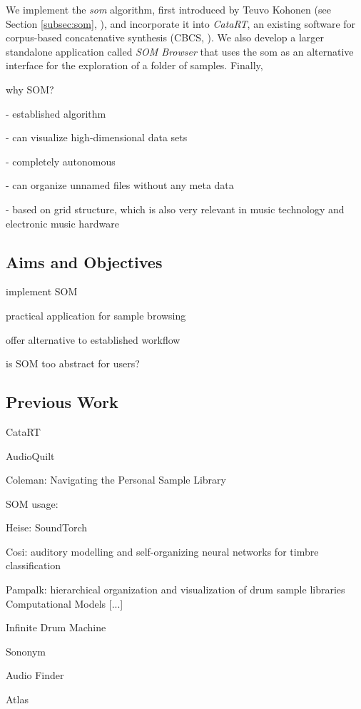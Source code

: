 \smallskip

We implement the \textit{\gls{som}} algorithm, first
introduced by Teuvo Kohonen (see Section \ref{subsec:som}, \citet{kohonen1990}),
and incorporate it into \textit{CataRT}, an existing software for corpus-based
concatenative synthesis (CBCS, \citet{schwarz2006}). We also develop a larger
standalone application called \textit{SOM Browser} that uses the \gls{som} as an
alternative interface for the exploration of a folder of samples. Finally,


\bigskip



why SOM?

- established algorithm

- can visualize high-dimensional data sets

- completely autonomous

- can organize unnamed files without any meta data

- based on grid structure, which is also very relevant in music technology and
electronic music hardware
\citet{adeney2009}



\subsection{Aims and Objectives}
\label{subsec:aims}

implement SOM

practical application for sample browsing

offer alternative to established workflow



is SOM too abstract for users?



\subsection{Previous Work}
\label{subsec:previous_work}

CataRT
\citet{schwarz2006}

AudioQuilt
\citet{fried2014}

Coleman: Navigating the Personal Sample Library
\citet{coleman2007}

SOM usage:

Heise: SoundTorch
\citet{heise2008}

Cosi:
auditory modelling and self-organizing neural networks for timbre classification
\citet{cosi1994}

Pampalk:
hierarchical organization and visualization of drum sample libraries
\citet{pampalk2004}
Computational Models [...]
\citet{pampalk2008}

Infinite Drum Machine
\citet{mcdonald2017}

Sononym
\citet{nielsen2018}

Audio Finder
\citet{audiofinder2019}

Atlas
\citet{atlas2018}
